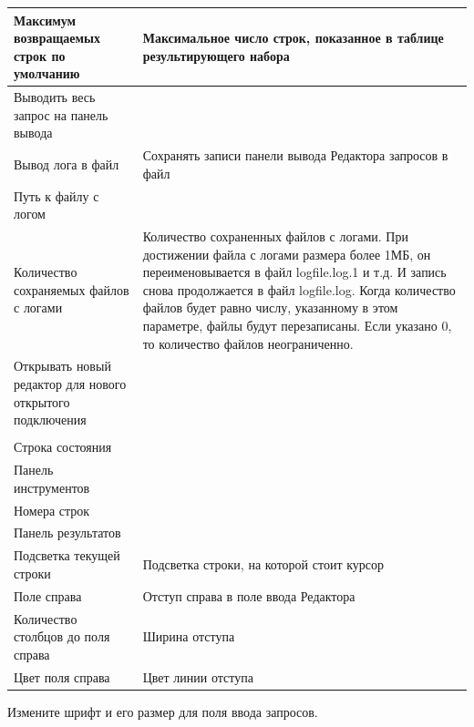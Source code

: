 \begin{longtable}[r]{|>{\ttfamily}m{6cm}|m{9cm}|}
	Максимум возвращаемых строк по умолчанию
	& Максимальное число строк, показанное в таблице результирующего набора \\\hline 
	Выводить весь запрос на панель вывода 
	& \\\hline 
	Вывод лога в файл
	&  Сохранять записи панели вывода Редактора запросов в файл\\\hline 
	Путь к файлу с логом
	&  \\\hline
	Количество сохраняемых файлов с логами
	& Количество сохраненных файлов с логами. При достижении файла с логами размера более 1МБ, он переименовывается в файл logfile.log.1 и т.д. И запись снова продолжается в файл logfile.log. Когда количество файлов будет равно числу, указанному в этом параметре, файлы будут перезаписаны. Если указано 0, то количество файлов неограниченно.\\\hline
	Открывать новый редактор для нового открытого подключения
	&  \\\hline
	\rowcolor[gray]{.9}\multicolumn{2}{|m{15.25cm}|}{\bfseries Настройки отображения}\\\hline     
	Строка состояния
	&  \\\hline
	Панель инструментов
	&  \\\hline
	Номера строк
	&  \\\hline
	Панель результатов
	& \\\hline
	Подсветка текущей строки
	& Подсветка строки, на которой стоит курсор \\\hline
	Поле справа
	& Отступ справа в поле ввода Редактора\\\hline
	Количество столбцов до поля справа
	& Ширина отступа\\\hline
	Цвет поля справа
	& Цвет линии отступа \\\hline      
\end{longtable}


Измените шрифт и его размер для поля ввода запросов.


